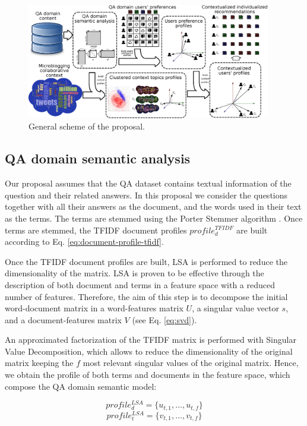 \documentclass[preprint]{elsarticle}
\begin{document}
\begin{spacing}{1.5}
\begin{figure}[h]
	\centering
	\includegraphics[width=0.95\textwidth]{figures/proposal-scheme-v3.eps}
	\caption{General scheme of the proposal.}
	\label{fig:proposal-scheme}
\end{figure}

\subsection{QA domain semantic analysis}
\label{sec:proposal-qa-semantic-analysis}

Our proposal assumes that the QA dataset contains textual information of the question and their related answers. In this proposal we consider the questions together with all their answers as the document, and the words used in their text as the terms. The terms are stemmed using the Porter Stemmer algorithm \citep{Porter1980}. Once terms are stemmed, the TFIDF document profiles $profile^{TFIDF}_{d}$ are built according to Eq. \ref{eq:document-profile-tfidf}.

Once the TFIDF document profiles are built, LSA is performed to reduce the dimensionality of the matrix. LSA is proven to be effective through the description of both document and terms in a feature space with a reduced number of features. Therefore, the aim of this step is to decompose the initial word-document matrix in a word-features matrix $U$, a singular value vector $s$, and a document-features matrix $V$ (see Eq. \ref{eq:svd}).

An approximated factorization of the TFIDF matrix is performed with Singular Value Decomposition, which allows to reduce the dimensionality of the original matrix keeping the $f$ most relevant singular values of the original matrix. Hence, we obtain the profile of both terms and documents in the feature space, which compose the QA domain semantic model:

\begin{equation}
	profile^{LSA}_d = \{ u_{t,1},\dots, u_{t,f}\}
\end{equation}
\begin{equation}
	profile^{LSA}_t = \{ v_{t,1},\dots, v_{t,f}\}
\end{equation}


\end{spacing}
\end{document}
